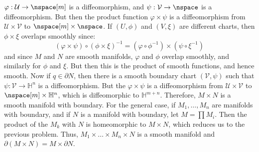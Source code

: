 \documentclass{article}                                                        %
\begin{document}
\begin{solution}
                $\varphi:\mathcal{U}\rightarrow\nspace[m]$ is a diffeomorphism, and
                $\psi:\mathcal{V}\rightarrow\nspace$ is a diffeomorphism. But then
                the product function $\varphi\times\psi$ is a diffeomorphism from
                $\mathcal{U}\times\mathcal{V}$ to $\nspace[m]\times\nspace$. If
                $(U,\phi)$ and $(V,\xi)$ are different charts, then
                $\phi\times\xi$ overlaps smoothly since:
                \begin{equation}
                    (\varphi\times\psi)\circ(\phi\times\xi)^{\minus{1}}
                    =(\varphi\circ\phi^{\minus{1}})\times(\psi\circ\xi^{\minus{1}})
                \end{equation}
                and since $M$ and $N$ are smooth manifolds, $\varphi$ and $\phi$
                overlap smoothly, and similarly for $\phi$ and $\xi$. But then this
                is the product of smooth functions, and hence smooth. Now if
                $q\in\partial{N}$, then there is a smooth boundary chart
                $(\mathcal{V},\psi)$ such that
                $\psi:\mathcal{V}\rightarrow\mathbb{H}^{n}$ is a diffeomorphism.
                But the $\varphi\times\psi$ is a diffeomorphism from
                $\mathcal{U}\times\mathcal{V}$ to
                $\nspace[m]\times\mathbb{H}^{n}$, which is diffeomorphic to
                $\mathbb{H}^{m+n}$. Therefore, $M\times{N}$ is a smooth manifold
                with boundary. For the general case, if $M_{1},\dots,M_{n}$ are
                manifolds with boundary, and if $N$ is a manifold with boundary,
                let $M=\prod{M}_{i}$. Then the product of the $M_{k}$ with $N$ is
                homeomorphic to $M\times{N}$, which reduces us to the previous
                problem. Thus, $M_{1}\times\dots\times{M}_{n}\times{N}$ is a smooth
                manifold and $\partial(M\times{N})=M\times\partial{N}$.
            \end{solution}
\end{document}

